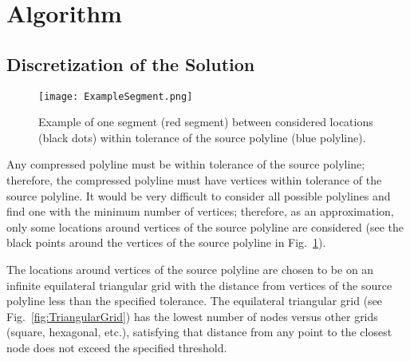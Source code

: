 \documentclass[conference]{IEEEtran}
\begin{document}
\section{Algorithm}

\subsection
{
  Discretization of the Solution
  \label{sec:Descretization}
}

\begin{figure} [b]
  \centering
  \texttt{[image: ExampleSegment.png]}
  \caption
  {
    Example of one segment (red segment) between considered locations (black dots) within tolerance of the source polyline (blue polyline).
  }
  \label{fig:ExampleSegment}
\end{figure}

Any compressed polyline must be within tolerance of the source polyline; therefore, the compressed polyline must have vertices within tolerance of the source polyline. It would be very difficult to consider all possible polylines and find one with the minimum number of vertices; therefore, as an approximation, only some locations around vertices of the source polyline are considered (see the black points around the vertices of the source polyline in Fig.~\ref{fig:ExampleSegment}).

The locations around vertices of the source polyline are chosen to be on an infinite equilateral triangular grid with the distance from vertices of the source polyline less than the specified tolerance. The equilateral triangular grid (see Fig.~\ref{fig:TriangularGrid}) has the lowest number of nodes versus other grids (square, hexagonal, etc.), satisfying that distance from any point to the closest node does not exceed the specified threshold.
\end{document}
